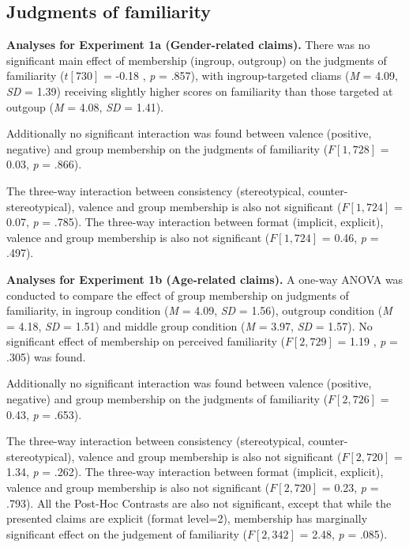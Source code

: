 \documentclass[man]{apa6}
\begin{document}
\subsection{\texorpdfstring{\textbf{Judgments of
familiarity}}{Judgments of familiarity}}\label{judgments-of-familiarity}

\textbf{Analyses for Experiment 1a (Gender-related claims).} There was
no significant main effect of membership (ingroup, outgroup) on the
judgments of familiarity (\(t [730]\) = -0.18 , \emph{p} = .857), with
ingroup-targeted cliams (\emph{M} = 4.09, \emph{SD} = 1.39) receiving
slightly higher scores on familiarity than those targeted at outgoup
(\emph{M} = 4.08, \emph{SD} = 1.41).

Additionally no significant interaction was found between valence
(positive, negative) and group membership on the judgments of
familiarity (\(F [1, 728]\) = 0.03, \emph{p} = .866).

The three-way interaction between consistency (stereotypical,
counter-stereotypical), valence and group membership is also not
significant (\(F [1, 724]\) = 0.07, \emph{p} = .785). The three-way
interaction between format (implicit, explicit), valence and group
membership is also not significant (\(F [1, 724]\) = 0.46, \emph{p} =
.497).

\textbf{Analyses for Experiment 1b (Age-related claims).} A one-way
ANOVA was conducted to compare the effect of group membership on
judgments of familiarity, in ingroup condition (\emph{M} = 4.09,
\emph{SD} = 1.56), outgroup condition (\emph{M} = 4.18, \emph{SD} =
1.51) and middle group condition (\emph{M} = 3.97, \emph{SD} = 1.57). No
significant effect of membership on perceived familiarity
(\(F [2, 729]\) = 1.19 , \emph{p} = .305) was found.

Additionally no significant interaction was found between valence
(positive, negative) and group membership on the judgments of
familiarity (\(F [2, 726]\) = 0.43, \emph{p} = .653).

The three-way interaction between consistency (stereotypical,
counter-stereotypical), valence and group membership is also not
significant (\(F [2, 720]\) = 1.34, \emph{p} = .262). The three-way
interaction between format (implicit, explicit), valence and group
membership is also not significant (\(F [2, 720]\) = 0.23, \emph{p} =
.793). All the Post-Hoc Contrasts are also not significant, except that
while the presented claims are explicit (format level=2), membership has
marginally significant effect on the judgement of familiarity
(\(F [2, 342]\) = 2.48, \emph{p} = .085).
\end{document}
